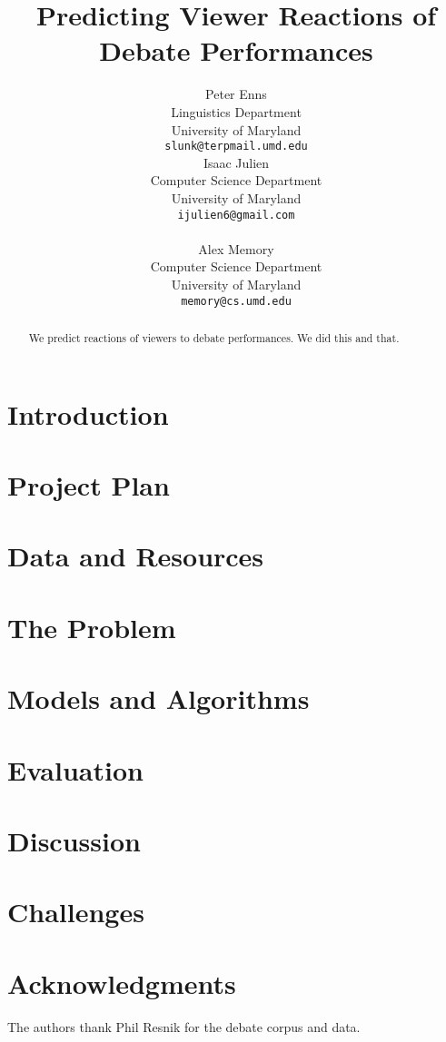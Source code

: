 \documentclass[11pt]{article}
\title{Predicting Viewer Reactions of Debate Performances}
\author{Peter Enns \\
  Linguistics Department \\
  University of Maryland \\
  {\tt slunk@terpmail.umd.edu} \\\And
  Isaac Julien \\
  Computer Science Department \\
  University of Maryland \\
  {\tt ijulien6@gmail.com} \\ \\\And
  Alex Memory \\
  Computer Science Department \\
  University of Maryland \\
  {\tt memory@cs.umd.edu} \\
  }
\date{}
\begin{document}
\maketitle
\begin{abstract}
  We predict reactions of viewers to debate performances.  We did this and that.
\end{abstract}

\section{Introduction}


\section{Project Plan}


\section{Data and Resources}


\section{The Problem}


\section{Models and Algorithms}


\section{Evaluation}


\section{Discussion}


\section{Challenges}


\section*{Acknowledgments}
The authors thank Phil Resnik for the debate corpus and data.
\end{document}
